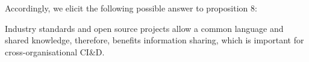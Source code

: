 Accordingly, we elicit the following possible answer to proposition 8:

Industry standards and open source projects allow a common language and shared knowledge, therefore, benefits information sharing, which is important for cross-organisational CI\&D.






%
